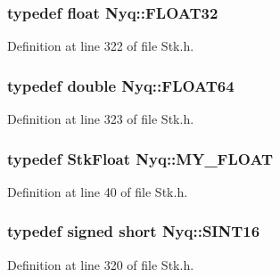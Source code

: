 \subsubsection[{\texorpdfstring{F\+L\+O\+A\+T32}{FLOAT32}}]{\setlength{\rightskip}{0pt plus 5cm}typedef float {\bf Nyq\+::\+F\+L\+O\+A\+T32}}\hypertarget{namespace_nyq_a2e0284e7d509ea289c81a66a5bba2d74}{}\label{namespace_nyq_a2e0284e7d509ea289c81a66a5bba2d74}


Definition at line 322 of file Stk.\+h.

\subsubsection[{\texorpdfstring{F\+L\+O\+A\+T64}{FLOAT64}}]{\setlength{\rightskip}{0pt plus 5cm}typedef double {\bf Nyq\+::\+F\+L\+O\+A\+T64}}\hypertarget{namespace_nyq_aec688324c08f135b685ca1b5a5167d05}{}\label{namespace_nyq_aec688324c08f135b685ca1b5a5167d05}


Definition at line 323 of file Stk.\+h.

\subsubsection[{\texorpdfstring{M\+Y\+\_\+\+F\+L\+O\+AT}{MY_FLOAT}}]{\setlength{\rightskip}{0pt plus 5cm}typedef {\bf Stk\+Float} {\bf Nyq\+::\+M\+Y\+\_\+\+F\+L\+O\+AT}}\hypertarget{namespace_nyq_aae9a9f995a31fe0943328e4c69dac133}{}\label{namespace_nyq_aae9a9f995a31fe0943328e4c69dac133}


Definition at line 40 of file Stk.\+h.

\subsubsection[{\texorpdfstring{S\+I\+N\+T16}{SINT16}}]{\setlength{\rightskip}{0pt plus 5cm}typedef signed short {\bf Nyq\+::\+S\+I\+N\+T16}}\hypertarget{namespace_nyq_acffddc601d91a00c01999ac7f22e08b5}{}\label{namespace_nyq_acffddc601d91a00c01999ac7f22e08b5}


Definition at line 320 of file Stk.\+h.

